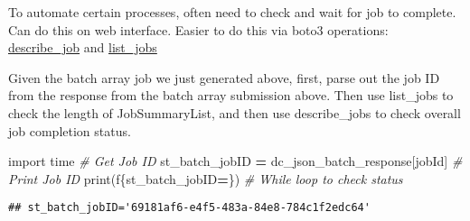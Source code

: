 \documentclass[
]{book}
\newenvironment{Shaded}{\begin{snugshade}}{\end{snugshade}}
\newcommand{\BuiltInTok}[1]{#1}
\newcommand{\CommentTok}[1]{\textcolor[rgb]{0.56,0.35,0.01}{\textit{#1}}}
\newcommand{\ImportTok}[1]{#1}
\newcommand{\NormalTok}[1]{#1}
\newcommand{\OperatorTok}[1]{\textcolor[rgb]{0.81,0.36,0.00}{\textbf{#1}}}
\newcommand{\SpecialCharTok}[1]{\textcolor[rgb]{0.00,0.00,0.00}{#1}}
\newcommand{\SpecialStringTok}[1]{\textcolor[rgb]{0.31,0.60,0.02}{#1}}
\newcommand{\StringTok}[1]{\textcolor[rgb]{0.31,0.60,0.02}{#1}}
\begin{document}
To automate certain processes, often need to check and wait for job to complete. Can do this on web interface. Easier to do this via boto3 operations: \href{https://boto3.amazonaws.com/v1/documentation/api/latest/reference/services/batch.html\#Batch.Client.describe_jobs}{describe\_job} and \href{https://boto3.amazonaws.com/v1/documentation/api/latest/reference/services/batch.html\#Batch.Client.list_jobs}{list\_jobs}

Given the batch array job we just generated above, first, parse out the job ID from the response from the batch array submission above. Then use list\_jobs to check the length of JobSummaryList, and then use describe\_jobs to check overall job completion status.

\begin{Shaded}
\begin{Highlighting}[]
\ImportTok{import}\NormalTok{ time }
\CommentTok{\# Get Job ID}
\NormalTok{st\_batch\_jobID }\OperatorTok{=}\NormalTok{ dc\_json\_batch\_response[}\StringTok{\textquotesingle{}jobId\textquotesingle{}}\NormalTok{]}
\CommentTok{\# Print Job ID}
\BuiltInTok{print}\NormalTok{(}\SpecialStringTok{f\textquotesingle{}}\SpecialCharTok{\{}\NormalTok{st\_batch\_jobID}\OperatorTok{=}\SpecialCharTok{\}}\SpecialStringTok{\textquotesingle{}}\NormalTok{)}
\CommentTok{\# While loop to check status}
\end{Highlighting}
\end{Shaded}

\begin{verbatim}
## st_batch_jobID='69181af6-e4f5-483a-84e8-784c1f2edc64'
\end{verbatim}
\end{document}
